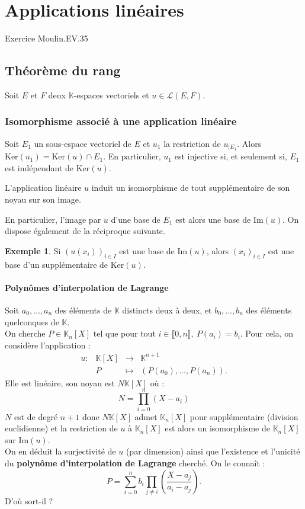 \documentclass[french]{article}
\newcommand{\K}{\mathbb{K}}
\renewcommand{\ker}{\text{Ker}}
\theoremstyle{plain}
\theoremstyle{definition}
\newtheorem*{ex}{Exemple}
\theoremstyle{remark}
\begin{document}
\section{Applications linéaires}

Exercice Moulin.EV.35

\subsection{Théorème du rang}

Soit $E$ et $F$ deux $\K$-espaces vectoriels et $u\in\mathcal{L}(E,F)$.

\subsubsection*{Isomorphisme associé à une application linéaire}

Soit $E_1$ un sous-espace vectoriel de $E$ et $u_1$ la restriction de $u_{\mid E_1}$. Alors $\ker(u_1)=\ker(u)\cap E_1$. En particulier, $u_1$ est injective si, et seulement si, $E_1$ est indépendant de $\ker(u)$.

\begin{thm}
	L'application linéaire $u$ induit un isomorphisme de tout supplémentaire de son noyau sur son image.
\end{thm}

En particulier, l'image par $u$ d'une base de $E_1$ est alors une base de $\text{Im}(u)$. On dispose également de la réciproque suivante.

\begin{ex}
	Si $(u(x_i))_{i\in I}$ est une base de $\text{Im}(u)$, alors $(x_i)_{i\in I}$ est une base d'un supplémentaire de $\ker(u)$.
\end{ex}

\paragraph{Polynômes d'interpolation de Lagrange}
Soit $a_0,\ldots,a_n$ des éléments de $\K$ distincts deux à deux, et $b_0,\ldots,b_n$ des éléments quelconques de $\K$. \\
On cherche $P\in\K_n[X]$ tel que pour tout $i\in\llbracket0,n\rrbracket,\ P(a_i)=b_i$. Pour cela, on considère l'application : $$\begin{array}{lrcl}
	u:&\K[X]&\longrightarrow&\K^{n+1}\\
	&P&\longmapsto&(P(a_0),\ldots,P(a_n)).
\end{array}$$ Elle est linéaire, son noyau est $N\K[X]$ où : $$N=\prod_{i=0}^{n}(X-a_i)$$ $N$ est de degré $n+1$ donc $N\K[X]$ admet $\K_n[X]$ pour supplémentaire (division euclidienne) et la restriction de $u$ à $\K_n[X]$ est alors un isomorphisme de $\K_n[X]$ sur $\text{Im}(u)$. \\
On en déduit la surjectivité de $u$ (par dimension) ainsi que l'existence et l'unicité du \textbf{polynôme d'interpolation de Lagrange} cherché. On le connaît : $$P=\sum_{i=0}^{n}b_i\prod_{j\ne i}\left(\frac{X-a_j}{a_i-a_j}\right).$$ D'où sort-il ? %
\end{document}
